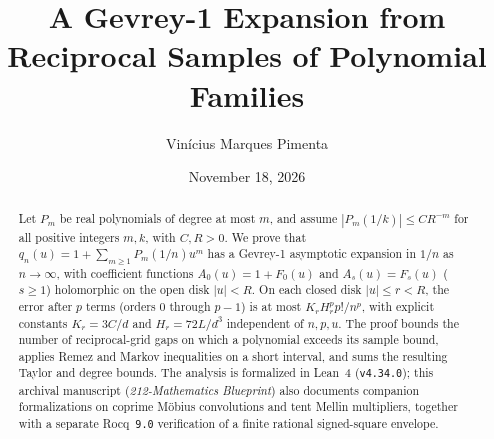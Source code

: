 \documentclass[11pt]{amsart}
\title[212-Mathematics Blueprint]{A Gevrey-1 Expansion from Reciprocal Samples of Polynomial Families}
\author{Vinícius Marques Pimenta}
\date{November 18, 2026}
\theoremstyle{definition}
\theoremstyle{remark}
\begin{document}
\begin{abstract}
Let $P_m$ be real polynomials of degree at most $m$, and assume $|P_m(1/k)| \le C R^{-m}$ for all positive integers $m, k$, with $C, R > 0$. We prove that $q_n(u) = 1 + \sum_{m \ge 1} P_m(1/n) u^m$ has a Gevrey-1 asymptotic expansion in $1/n$ as $n \to \infty$, with coefficient functions $A_0(u) = 1 + F_0(u)$ and $A_s(u) = F_s(u)$ ($s \ge 1$) holomorphic on the open disk $|u| < R$. On each closed disk $|u| \le r < R$, the error after $p$ terms (orders $0$ through $p - 1$) is at most $K_r H_r^p p! / n^p$, with explicit constants $K_r = 3C/d$ and $H_r = 72L/d^3$ independent of $n, p, u$. The proof bounds the number of reciprocal-grid gaps on which a polynomial exceeds its sample bound, applies Remez and Markov inequalities on a short interval, and sums the resulting Taylor and degree bounds. The analysis is formalized in Lean~4 (\texttt{v4.34.0}); this archival manuscript (\emph{212-Mathematics Blueprint}) also documents companion formalizations on coprime M\"obius convolutions and tent Mellin multipliers, together with a separate Rocq~\texttt{9.0} verification of a finite rational signed-square envelope.
\end{abstract}
\maketitle
\tableofcontents


{\sloppy}
\end{document}
